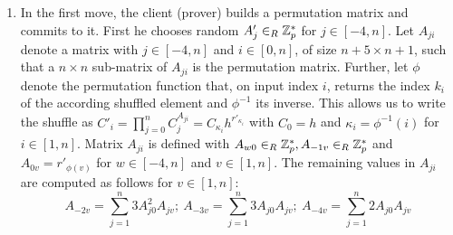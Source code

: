 \begin{enumerate}
  \item In the first move, the client (prover) builds a permutation matrix and commits to it.
  First he chooses random $A'_j\in_R\mathbb{Z}^\ast_p$ for $j\in[-4,n]$.
Let $A_{ji}$ denote a matrix with $j\in[-4,n]$ and $i\in[0,n]$, \ie of size $n+5\times n+1$, such that a $n\times n$ sub-matrix of $A_{ji}$ is the permutation matrix.
Further, let $\phi$ denote the permutation function that, on input index $i$, returns the index $k_i$ of the according shuffled element and $\phi^{-1}$ its inverse.
This allows us to write the shuffle as $C'_{i}=\prod_{j=0}^{n}C_{j}^{A_{ji}}=C_{\kappa_i}h^{r'_{\kappa_i}}$ with $C_0=h$ and $\kappa_i=\phi^{-1}(i)$ for $i\in[1,n]$.
Matrix $A_{ji}$ is defined with $A_{w0}\in_R\mathbb{Z}^\ast_p, A_{-1v}\in_R\mathbb{Z}^\ast_p$ and $A_{0v}=r'_{\phi(v)}$ for $w\in[-4,n]$ and $v\in[1,n]$. %
The remaining values in $A_{ji}$ are computed as follows for $v\in[1,n]$:
\[ 
  A_{-2v}=\sum_{j=1}^{n} 3A_{j0}^2 A_{jv};~ A_{-3v}=\sum_{j=1}^{n} 3A_{j0} A_{jv};~ 
  A_{-4v}=\sum_{j=1}^{n} 2A_{j0} A_{jv}
\]



\end{enumerate}
